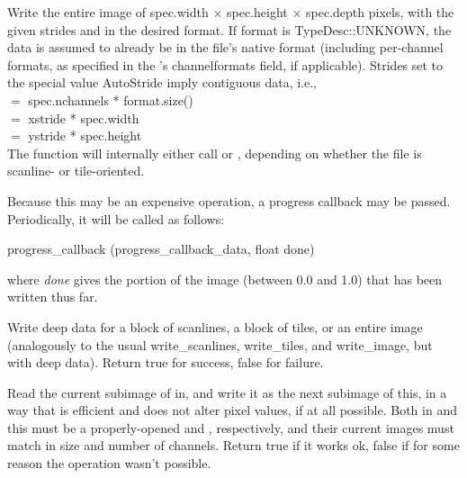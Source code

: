 Write the entire image of {\kw spec.width} $\times$ {\kw spec.height}
$\times$ {\kw spec.depth}
pixels, with the given strides and in the desired format.
If {\cf format} is {\cf TypeDesc::UNKNOWN}, the data is assumed to
already be in the file's native format (including per-channel formats, 
as specified in the \ImageSpec's {\cf channelformats} field, if applicable).
Strides set to the special value {\kw AutoStride} imply contiguous data,
i.e., \\
 $=$ {\kw spec.nchannels * format.size()} \\
 $=$ {\kw xstride * spec.width} \\
 $=$ {\kw ystride * spec.height}\\
The function will internally either call \writescanline or 
\writetile, depending on whether the file is scanline- or
tile-oriented.

Because this may be an expensive operation, a progress callback may be passed.
Periodically, it will be called as follows:
\begin{code}
        progress_callback (progress_callback_data, float done)
\end{code}
\noindent where \emph{done} gives the portion of the image 
(between 0.0 and 1.0) that has been written thus far.

\apiend


Write deep data for a block of scanlines, a block of tiles, or an entire
image (analogously to the usual {\cf write_scanlines}, {\cf write_tiles},
and {\cf write_image}, but with deep data).
Return {\kw true} for success, {\kw false} for failure.
\apiend



Read the current subimage of {\cf in}, and write it as the next subimage
of {\cf *this}, in a way that is efficient and does not alter pixel
values, if at all possible.  Both {\cf in} and {\cf this} must be a
properly-opened \ImageInput and \ImageOutput, respectively, and their
current images must match in size and number of channels.  Return {\cf true}
if it works ok, {\cf false} if for some reason the operation wasn't possible.

